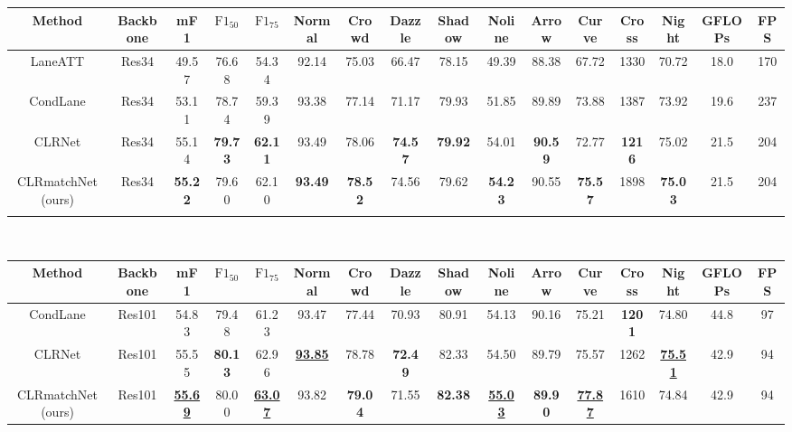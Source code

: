 \documentclass[10pt,twocolumn,letterpaper]{article}
\begin{document}
\begin{table*}[h]
\begin{adjustbox}{width=\textwidth} 
\begin{tabular}{cccccccccccccccc}
\hline
Method & Backbone & mF1 & $\text{F1}_{50}$ &  $\text{F1}_{75}$  & Normal & Crowd & Dazzle & Shadow & Noline & Arrow& Curve  & Cross & Night & GFLOPs & FPS \\
\hline
LaneATT \cite{LaneATT} & Res34 & 49.57 & 76.68 & 54.34 &  92.14 & 75.03 & 66.47 & 78.15 & 49.39 & 88.38 & 67.72 & 1330 & 70.72 & 18.0 & 170 \\
CondLane\cite{CondLaneNet}  & Res34 & 53.11 & 78.74 & 59.39 & 93.38 & 77.14 &  71.17 & 79.93 & 51.85 & 89.89 & 73.88 & 1387 & 73.92 & 19.6 & 237\\
CLRNet\cite{CLRNet} & Res34 & 55.14 & \textbf{79.73} & \textbf{62.11} & 93.49 & 78.06 & \textbf{74.57} & \textbf{79.92} & 54.01 & \textbf{90.59} & 72.77 & \textbf{1216} & 75.02 & 21.5 &  204 \\
\hline
CLRmatchNet (ours)& Res34 & \textbf{55.22}& 79.60 & 62.10 & \textbf{93.49}\textbf{ }& \textbf{78.52} & 74.56 & 79.62 & \textbf{54.23} & 90.55 & \textbf{75.57} & 1898 & \textbf{75.03} & 21.5 & 204 \\
\hline
 &  &  &  &  &  &  &  &  &  &  &  &  &  &  &\\
\end{tabular}
\end{adjustbox}
\\
\begin{adjustbox}{width=\textwidth} 
\begin{tabular}{cccccccccccccccc}
\hline
Method & Backbone & mF1 & $\text{F1}_{50}$ &  $\text{F1}_{75}$  & Normal & Crowd & Dazzle & Shadow & Noline & Arrow& Curve  & Cross & Night & GFLOPs & FPS \\
\hline
CondLane\cite{CondLaneNet}  & Res101 & 54.83 & 79.48 & 61.23 & 93.47 & 77.44 & 70.93 & 80.91 & 54.13 & 90.16 & 75.21 & \textbf{1201}& 74.80 & 44.8 & 97\\
CLRNet\cite{CLRNet} & Res101 & 55.55 & \textbf{80.13} & 62.96 & \underline{\textbf{93.85}} & 78.78 & \textbf{72.49} & 82.33 & 54.50 & 89.79 & 75.57 & 1262 & \underline{\textbf{75.51}} & 42.9 & 94 \\
\hline
CLRmatchNet (ours)& Res101 & \underline{\textbf{55.69}} & 80.00 & \underline{\textbf{63.07}} & 93.82 & \textbf{79.04} & 71.55 & \textbf{82.38} & \underline{\textbf{55.03}} & \textbf{89.90 }& \underline{\textbf{77.87}} & 1610 & 74.84 &  42.9 & 94 \\

\end{tabular}
\end{adjustbox}
\end{table*}
\end{document}
